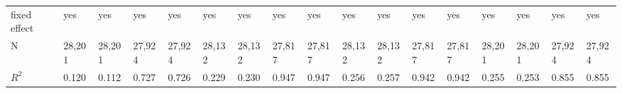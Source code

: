 \begin{tabular}{lllllllllllllllll}
fixed effect                 &                                 yes &                                 yes &                                 yes &                                yes &                                 yes &                                 yes &                                 yes &                                 yes &                                 yes &                                 yes &                                 yes &                                 yes &                                 yes &                                yes &                                yes &                                yes \\
N                            &                              28,201 &                              28,201 &                              27,924 &                             27,924 &                              28,132 &                              28,132 &                              27,817 &                              27,817 &                              28,132 &                              28,132 &                              27,817 &                              27,817 &                              28,201 &                             28,201 &                             27,924 &                             27,924 \\
$R^2$                        &                               0.120 &                               0.112 &                               0.727 &                              0.726 &                               0.229 &                               0.230 &                               0.947 &                               0.947 &                               0.256 &                               0.257 &                               0.942 &                               0.942 &                               0.255 &                              0.253 &                              0.855 &                              0.855 \\
\bottomrule
\end{tabular}

